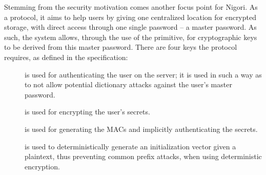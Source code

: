 \begin{comment}
\begin{description}
  \item[\myref{SHA-1(M)}] is a secure hash function that generates a 160--bit message digest, as specified in RFC3174 \cite{RFC3174}, applied to message \myref{M}.
  \item[\myref{HMAC(K, M)}] represents the hash--based message authentication code of message \myref{M}, using key \myref{K}, as specified in RFC2104 \cite{RFC2104}.
  \item[\myref{PBKDF(PRF, P, S, C, dkLen)}] is the password based key derivation function, as specified in its respective RFC2898 \cite{RFC2898}, under \myref{PBKDF2}.
  Here, \myref{PRF} represents a pseudo--random function -- \myref{SHA-1} for Nigori's case --, \myref{P} represents the given password, \myref{S} the salt, \myref{C} the number of iterations and \myref{dkLen}, the expected output length.
  \item[\myref{DSA}] represents the Digital Signature Algorithm, as specified by the FIPS186 document \cite{DSA}.
  For Nigori, we require generating the public and private key pairs, signing message content and verifying signatures afterwards.
  The specification defines fixed parameters for obtaining a public key of size 3072 bits and a private key of 128 bits.
\end{description}
\end{comment}

Stemming from the security motivation comes another focus point for Nigori.
As a protocol, it aims to help users by giving one centralized location for encrypted storage, with direct access through one single password -- a master password.
As such, the system allows, through the use of the  primitive, for cryptographic keys to be derived from this master password.
There are four keys the protocol requires, as defined in the specification:
\begin{description}
  \item[] is used for authenticating the user on the server; it is used in such a way as to not allow potential dictionary attacks against the user's master password.
  \item[] is used for encrypting the user's secrets.
  \item[] is used for generating the MACs and implicitly authenticating the secrets.
  \item[] is used to deterministically generate an initialization vector given a plaintext, thus preventing common prefix attacks, when using deterministic encryption.
\end{description}

